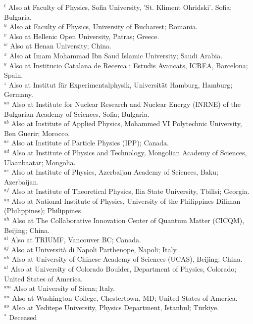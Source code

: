 \documentclass[PAPER, atlasdraft=false, USenglish, cernpreprint]{atlasdoc}
\begin{document}
\begin{flushleft}
$^{t}$ Also at Faculty of Physics, Sofia University, 'St. Kliment Ohridski', Sofia; Bulgaria.\\
$^{u}$ Also at Faculty of Physics, University of Bucharest; Romania.\\
$^{v}$ Also at Hellenic Open University, Patras; Greece.\\
$^{w}$ Also at Henan University; China.\\
$^{x}$ Also at Imam Mohammad Ibn Saud Islamic University; Saudi Arabia.\\
$^{y}$ Also at Institucio Catalana de Recerca i Estudis Avancats, ICREA, Barcelona; Spain.\\
$^{z}$ Also at Institut f\"{u}r Experimentalphysik, Universit\"{a}t Hamburg, Hamburg; Germany.\\
$^{aa}$ Also at Institute for Nuclear Research and Nuclear Energy (INRNE) of the Bulgarian Academy of Sciences, Sofia; Bulgaria.\\
$^{ab}$ Also at Institute of Applied Physics, Mohammed VI Polytechnic University, Ben Guerir; Morocco.\\
$^{ac}$ Also at Institute of Particle Physics (IPP); Canada.\\
$^{ad}$ Also at Institute of Physics and Technology, Mongolian Academy of Sciences, Ulaanbaatar; Mongolia.\\
$^{ae}$ Also at Institute of Physics, Azerbaijan Academy of Sciences, Baku; Azerbaijan.\\
$^{af}$ Also at Institute of Theoretical Physics, Ilia State University, Tbilisi; Georgia.\\
$^{ag}$ Also at National Institute of Physics, University of the Philippines Diliman (Philippines); Philippines.\\
$^{ah}$ Also at The Collaborative Innovation Center of Quantum Matter (CICQM), Beijing; China.\\
$^{ai}$ Also at TRIUMF, Vancouver BC; Canada.\\
$^{aj}$ Also at Universit\`a di Napoli Parthenope, Napoli; Italy.\\
$^{ak}$ Also at University of Chinese Academy of Sciences (UCAS), Beijing; China.\\
$^{al}$ Also at University of Colorado Boulder, Department of Physics, Colorado; United States of America.\\
$^{am}$ Also at University of Siena; Italy.\\
$^{an}$ Also at Washington College, Chestertown, MD; United States of America.\\
$^{ao}$ Also at Yeditepe University, Physics Department, Istanbul; Türkiye.\\
$^{*}$ Deceased

\end{flushleft}
\end{document}
